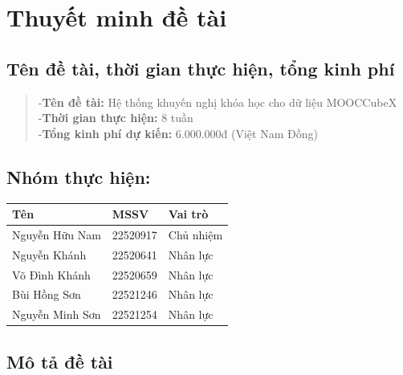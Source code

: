 \section{Thuyết minh đề tài}
\subsection{Tên đề tài, thời gian thực hiện, tổng kinh phí}
\begin{quote}
-\textbf{Tên đề tài:} Hệ thống khuyến nghị khóa học cho dữ liệu MOOCCubeX\\
-\textbf{Thời gian thực hiện:} 8 tuần \\
-\textbf{Tổng kinh phí dự kiến:} 6.000.000đ (Việt Nam Đồng)\\
\end{quote}
\subsection{Nhóm thực hiện:}
\begin{center}
\begin{tabular}{|| m{10em}  m{5em}  m{6em}||} 
 \hline
 Tên & MSSV & Vai trò \\ [0.5ex] 
 \hline\hline
 Nguyễn Hữu Nam & 22520917 & Chủ nhiệm  \\ 
 \hline
 Nguyễn Khánh & 22520641 & Nhân lực \\
 \hline
 Võ Đình Khánh & 22520659 & Nhân lực \\
 \hline
 Bùi Hồng Sơn & 22521246 & Nhân lực \\
 \hline
 Nguyễn Minh Sơn & 22521254 & Nhân lực\\ [1ex] 
 \hline
\end{tabular}
\end{center}
\subsection{Mô tả đề tài}
